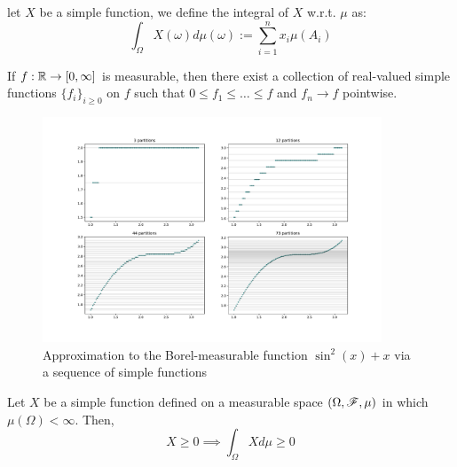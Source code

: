 \documentclass[../TGMAFFIRO.tex]{subfiles}
\begin{document}
\begin{definition}
	let $X$ be a simple function, we define the integral of $X$ w.r.t. $\mu$ as:
	\begin{equation}
		\int_\Omega X(\omega) d\mu(\omega) := \sum_{i=1}^{n}x_i\mu(A_i)
	\end{equation}
\end{definition}


\begin{theorem}
	If $f:\mathbb{R}\to[0, \infty]$ is measurable, then there exist a collection of real-valued simple functions $\{f_i\}_{i\geq 0}$ on $f$ such that $0 \leq f_1 \leq \ldots \leq f$ and $f_n \to f$ pointwise.
\end{theorem}

\begin{figure}[h]
	\centering
	\includegraphics[width=0.9\textwidth]{images/simple_sine.pdf}	
	\caption{Approximation to the Borel-measurable function $\sin^2(x) + x$ via a sequence of simple functions}
	\label{fig:simple_approx_sine}
\end{figure}

\begin{proposition} \label{prop:nnlmsf}
	Let $X$ be a simple function defined on a measurable space $(\Omega, \mathscr{F}, \mu)$ in which $\mu(\Omega) < \infty$. Then,
	\begin{equation}
		X \geq 0 \implies \int_\Omega X d\mu \geq 0
	\end{equation}
\end{proposition}
\end{document}
